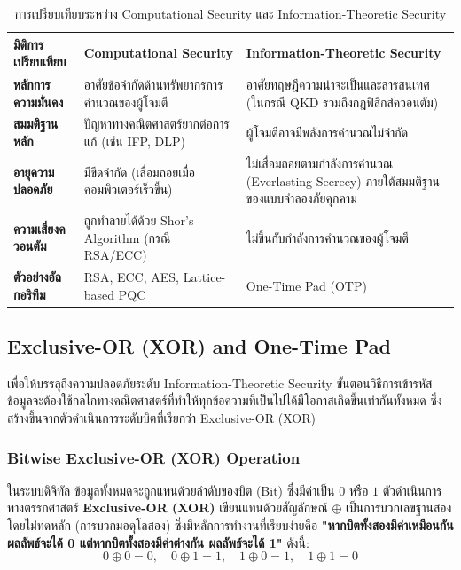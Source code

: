 \begin{table}[htbp]
\centering
\renewcommand{\arraystretch}{1.35}
\setlength{\extrarowheight}{2.5pt}
\begin{tabularx}{\textwidth}{>{\raggedright\arraybackslash}p{3.5cm} >{\raggedright\arraybackslash}X >{\raggedright\arraybackslash}X}
\hline
\textbf{มิติการเปรียบเทียบ} & \textbf{Computational Security} & \textbf{Information-Theoretic Security} \\ \hline
\rowcolor{white}
\textbf{หลักการความมั่นคง} & อาศัยข้อจำกัดด้านทรัพยากรการคำนวณของผู้โจมตี & อาศัยทฤษฎีความน่าจะเป็นและสารสนเทศ (ในกรณี QKD รวมถึงกฎฟิสิกส์ควอนตัม) \\
\rowcolor[HTML]{E4E7EB}
\textbf{สมมติฐานหลัก} & ปัญหาทางคณิตศาสตร์ยากต่อการแก้ (เช่น IFP, DLP) & ผู้โจมตีอาจมีพลังการคำนวณไม่จำกัด \\
\rowcolor{white}
\textbf{อายุความปลอดภัย} & มีขีดจำกัด (เสื่อมถอยเมื่อคอมพิวเตอร์เร็วขึ้น) & ไม่เสื่อมถอยตามกำลังการคำนวณ (Everlasting Secrecy) ภายใต้สมมติฐานของแบบจำลองภัยคุกคาม \\
\rowcolor[HTML]{E4E7EB}
\textbf{ความเสี่ยงควอนตัม} & ถูกทำลายได้ด้วย Shor's Algorithm (กรณี RSA/ECC) & ไม่ขึ้นกับกำลังการคำนวณของผู้โจมตี \\
\rowcolor{white}
\textbf{ตัวอย่างอัลกอริทึม} & RSA, ECC, AES, Lattice-based PQC & One-Time Pad (OTP) \\ \hline
\end{tabularx}
\caption{การเปรียบเทียบระหว่าง Computational Security และ Information-Theoretic Security}
\label{tab:comp_vs_infoth}
\end{table}

\subsection{Exclusive-OR (XOR) and One-Time Pad}
เพื่อให้บรรลุถึงความปลอดภัยระดับ Information-Theoretic Security ขั้นตอนวิธีการเข้ารหัสข้อมูลจะต้องใช้กลไกทางคณิตศาสตร์ที่ทำให้ทุกข้อความที่เป็นไปได้มีโอกาสเกิดขึ้นเท่ากันทั้งหมด ซึ่งสร้างขึ้นจากตัวดำเนินการระดับบิตที่เรียกว่า Exclusive-OR (XOR)

\subsubsection{Bitwise Exclusive-OR (XOR) Operation}
ในระบบดิจิทัล ข้อมูลทั้งหมดจะถูกแทนด้วยลำดับของบิต (Bit) ซึ่งมีค่าเป็น $0$ หรือ $1$ ตัวดำเนินการทางตรรกศาสตร์ \textbf{Exclusive-OR (XOR)} เขียนแทนด้วยสัญลักษณ์ $\oplus$ เป็นการบวกเลขฐานสองโดยไม่ทดหลัก (การบวกมอดุโลสอง) ซึ่งมีหลักการทำงานที่เรียบง่ายคือ \textbf{"หากบิตทั้งสองมีค่าเหมือนกัน ผลลัพธ์จะได้ 0 แต่หากบิตทั้งสองมีค่าต่างกัน ผลลัพธ์จะได้ 1"} ดังนี้:
\begin{equation}
    0 \oplus 0 = 0, \quad 0 \oplus 1 = 1, \quad 1 \oplus 0 = 1, \quad 1 \oplus 1 = 0
\end{equation}

